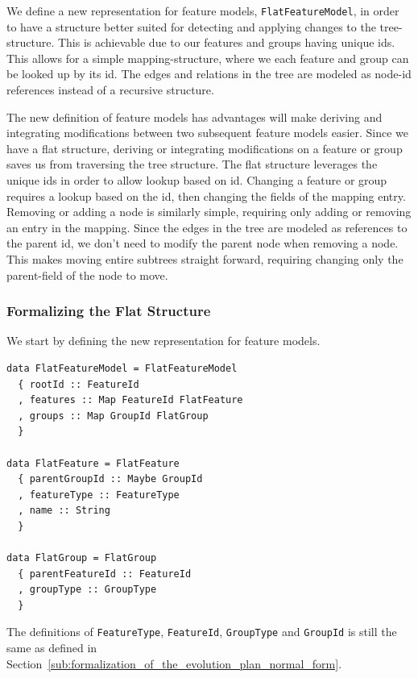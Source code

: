 \documentclass[a4paper,english]{ifimaster}
\begin{document}
We define a new representation for feature models, \texttt{FlatFeatureModel}, in order to have a structure better suited for detecting and applying changes to the tree-structure. This is achievable due to our features and groups having unique ids. This allows for a simple mapping-structure, where we each feature and group can be looked up by its id. The edges and relations in the tree are modeled as node-id references instead of a recursive structure.

The new definition of feature models has advantages will make deriving and integrating modifications between two subsequent feature models easier. Since we have a flat structure, deriving or integrating modifications on a feature or group saves us from traversing the tree structure. The flat structure leverages the unique ids in order to allow lookup based on id. Changing a feature or group requires a lookup based on the id, then changing the fields of the mapping entry. Removing or adding a node is similarly simple, requiring only adding or removing an entry in the mapping. Since the edges in the tree are modeled as references to the parent id, we don't need to modify the parent node when removing a node. This makes moving entire subtrees straight forward, requiring changing only the parent-field of the node to move.

\subsubsection{Formalizing the Flat Structure}%
\label{ssub:formalizing_the_flat_structure}

We start by defining the new representation for feature models.

\begin{verbatim}
data FlatFeatureModel = FlatFeatureModel
  { rootId :: FeatureId
  , features :: Map FeatureId FlatFeature
  , groups :: Map GroupId FlatGroup
  }

data FlatFeature = FlatFeature
  { parentGroupId :: Maybe GroupId
  , featureType :: FeatureType
  , name :: String
  }

data FlatGroup = FlatGroup
  { parentFeatureId :: FeatureId
  , groupType :: GroupType
  }
\end{verbatim}

The definitions of \texttt{FeatureType}, \texttt{FeatureId}, \texttt{GroupType} and \texttt{GroupId} is still the same as defined in Section~\vref{sub:formalization_of_the_evolution_plan_normal_form}.
\end{document}
